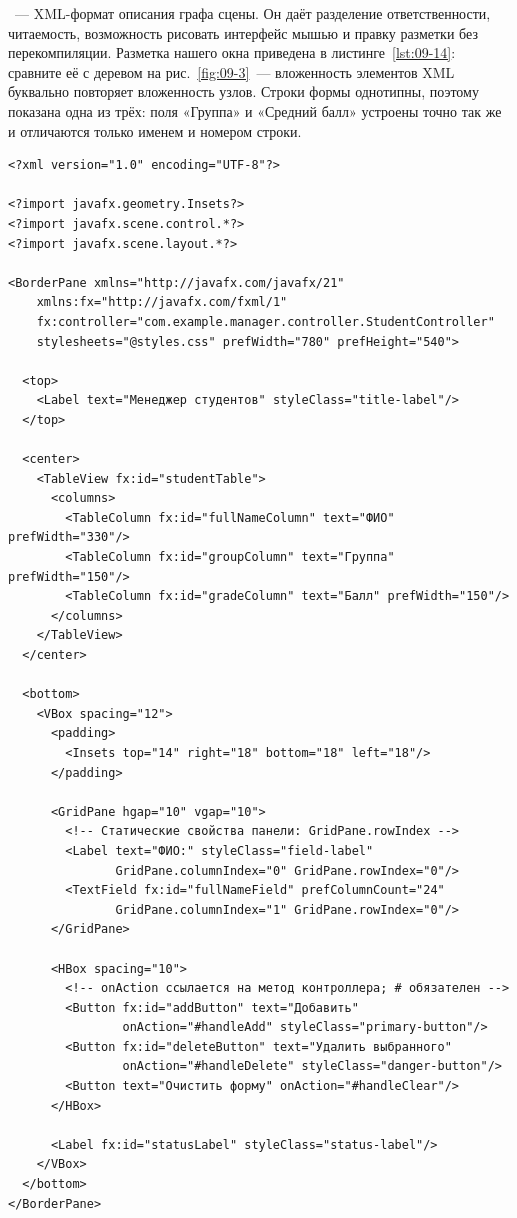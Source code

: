 ~--- XML-формат описания графа сцены. Он даёт разделение
ответственности, читаемость, возможность рисовать интерфейс мышью и правку
разметки без перекомпиляции. Разметка нашего окна приведена в
листинге~\ref{lst:09-14}: сравните её с деревом на рис.~\ref{fig:09-3}~---
вложенность элементов XML буквально повторяет вложенность узлов. Строки формы
однотипны, поэтому показана одна из трёх: поля «Группа» и «Средний балл»
устроены точно так же и отличаются только именем и номером строки.

\begin{listing}[H]
\begin{verbatim}
<?xml version="1.0" encoding="UTF-8"?>

<?import javafx.geometry.Insets?>
<?import javafx.scene.control.*?>
<?import javafx.scene.layout.*?>

<BorderPane xmlns="http://javafx.com/javafx/21"
    xmlns:fx="http://javafx.com/fxml/1"
    fx:controller="com.example.manager.controller.StudentController"
    stylesheets="@styles.css" prefWidth="780" prefHeight="540">

  <top>
    <Label text="Менеджер студентов" styleClass="title-label"/>
  </top>

  <center>
    <TableView fx:id="studentTable">
      <columns>
        <TableColumn fx:id="fullNameColumn" text="ФИО" prefWidth="330"/>
        <TableColumn fx:id="groupColumn" text="Группа" prefWidth="150"/>
        <TableColumn fx:id="gradeColumn" text="Балл" prefWidth="150"/>
      </columns>
    </TableView>
  </center>

  <bottom>
    <VBox spacing="12">
      <padding>
        <Insets top="14" right="18" bottom="18" left="18"/>
      </padding>

      <GridPane hgap="10" vgap="10">
        <!-- Статические свойства панели: GridPane.rowIndex -->
        <Label text="ФИО:" styleClass="field-label"
               GridPane.columnIndex="0" GridPane.rowIndex="0"/>
        <TextField fx:id="fullNameField" prefColumnCount="24"
               GridPane.columnIndex="1" GridPane.rowIndex="0"/>
      </GridPane>

      <HBox spacing="10">
        <!-- onAction ссылается на метод контроллера; # обязателен -->
        <Button fx:id="addButton" text="Добавить"
                onAction="#handleAdd" styleClass="primary-button"/>
        <Button fx:id="deleteButton" text="Удалить выбранного"
                onAction="#handleDelete" styleClass="danger-button"/>
        <Button text="Очистить форму" onAction="#handleClear"/>
      </HBox>

      <Label fx:id="statusLabel" styleClass="status-label"/>
    </VBox>
  </bottom>
</BorderPane>
\end{verbatim}
\caption{Представление: файл students-view.fxml}
\label{lst:09-14}
\end{listing}

